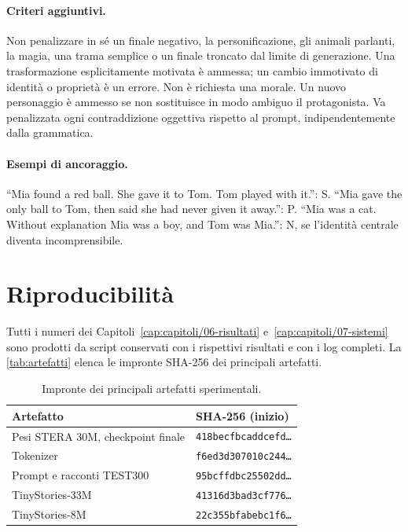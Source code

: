\paragraph{Criteri aggiuntivi.} Non penalizzare in sé un finale negativo, la personificazione, gli animali parlanti, la magia, una trama semplice o un finale troncato dal limite di generazione. Una trasformazione esplicitamente motivata è ammessa; un cambio immotivato di identità o proprietà è un errore. Non è richiesta una morale. Un nuovo personaggio è ammesso se non sostituisce in modo ambiguo il protagonista. Va penalizzata ogni contraddizione oggettiva rispetto al prompt, indipendentemente dalla grammatica.

\paragraph{Esempi di ancoraggio.} ``Mia found a red ball. She gave it to Tom. Tom played with it.'': S. ``Mia gave the only ball to Tom, then said she had never given it away.'': P. ``Mia was a cat. Without explanation Mia was a boy, and Tom was Mia.'': N, se l'identità centrale diventa incomprensibile.

\section{Riproducibilità}

Tutti i numeri dei Capitoli~\ref{cap:capitoli/06-risultati} e~\ref{cap:capitoli/07-sistemi} sono prodotti da script conservati con i rispettivi risultati e con i log completi. La \autoref{tab:artefatti} elenca le impronte SHA-256 dei principali artefatti.

\begin{table}[H]
\centering
\small
\begin{tabular}{ll}
\toprule
Artefatto & SHA-256 (inizio) \\
\midrule
Pesi STERA 30M, checkpoint finale & \texttt{418becfbcaddcefd\dots} \\
Tokenizer & \texttt{f6ed3d307010c244\dots} \\
Prompt e racconti TEST300 & \texttt{95bcffdbc25502dd\dots} \\
TinyStories-33M & \texttt{41316d3bad3cf776\dots} \\
TinyStories-8M & \texttt{22c355bfabebc1f6\dots} \\
\bottomrule
\end{tabular}
\caption{Impronte dei principali artefatti sperimentali.}
\label{tab:artefatti}
\end{table}

